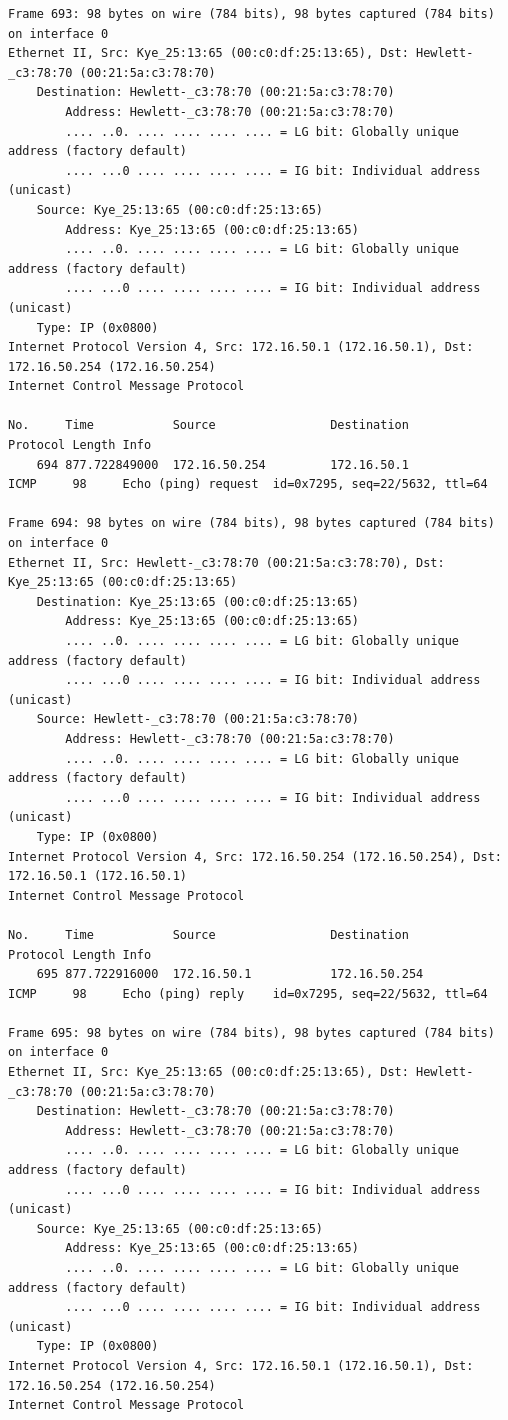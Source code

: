 \documentclass[a4paper,11pt]{article}
\begin{document}
\begin{lstlisting}
Frame 693: 98 bytes on wire (784 bits), 98 bytes captured (784 bits) on interface 0
Ethernet II, Src: Kye_25:13:65 (00:c0:df:25:13:65), Dst: Hewlett-_c3:78:70 (00:21:5a:c3:78:70)
    Destination: Hewlett-_c3:78:70 (00:21:5a:c3:78:70)
        Address: Hewlett-_c3:78:70 (00:21:5a:c3:78:70)
        .... ..0. .... .... .... .... = LG bit: Globally unique address (factory default)
        .... ...0 .... .... .... .... = IG bit: Individual address (unicast)
    Source: Kye_25:13:65 (00:c0:df:25:13:65)
        Address: Kye_25:13:65 (00:c0:df:25:13:65)
        .... ..0. .... .... .... .... = LG bit: Globally unique address (factory default)
        .... ...0 .... .... .... .... = IG bit: Individual address (unicast)
    Type: IP (0x0800)
Internet Protocol Version 4, Src: 172.16.50.1 (172.16.50.1), Dst: 172.16.50.254 (172.16.50.254)
Internet Control Message Protocol

No.     Time           Source                Destination           Protocol Length Info
    694 877.722849000  172.16.50.254         172.16.50.1           ICMP     98     Echo (ping) request  id=0x7295, seq=22/5632, ttl=64

Frame 694: 98 bytes on wire (784 bits), 98 bytes captured (784 bits) on interface 0
Ethernet II, Src: Hewlett-_c3:78:70 (00:21:5a:c3:78:70), Dst: Kye_25:13:65 (00:c0:df:25:13:65)
    Destination: Kye_25:13:65 (00:c0:df:25:13:65)
        Address: Kye_25:13:65 (00:c0:df:25:13:65)
        .... ..0. .... .... .... .... = LG bit: Globally unique address (factory default)
        .... ...0 .... .... .... .... = IG bit: Individual address (unicast)
    Source: Hewlett-_c3:78:70 (00:21:5a:c3:78:70)
        Address: Hewlett-_c3:78:70 (00:21:5a:c3:78:70)
        .... ..0. .... .... .... .... = LG bit: Globally unique address (factory default)
        .... ...0 .... .... .... .... = IG bit: Individual address (unicast)
    Type: IP (0x0800)
Internet Protocol Version 4, Src: 172.16.50.254 (172.16.50.254), Dst: 172.16.50.1 (172.16.50.1)
Internet Control Message Protocol

No.     Time           Source                Destination           Protocol Length Info
    695 877.722916000  172.16.50.1           172.16.50.254         ICMP     98     Echo (ping) reply    id=0x7295, seq=22/5632, ttl=64

Frame 695: 98 bytes on wire (784 bits), 98 bytes captured (784 bits) on interface 0
Ethernet II, Src: Kye_25:13:65 (00:c0:df:25:13:65), Dst: Hewlett-_c3:78:70 (00:21:5a:c3:78:70)
    Destination: Hewlett-_c3:78:70 (00:21:5a:c3:78:70)
        Address: Hewlett-_c3:78:70 (00:21:5a:c3:78:70)
        .... ..0. .... .... .... .... = LG bit: Globally unique address (factory default)
        .... ...0 .... .... .... .... = IG bit: Individual address (unicast)
    Source: Kye_25:13:65 (00:c0:df:25:13:65)
        Address: Kye_25:13:65 (00:c0:df:25:13:65)
        .... ..0. .... .... .... .... = LG bit: Globally unique address (factory default)
        .... ...0 .... .... .... .... = IG bit: Individual address (unicast)
    Type: IP (0x0800)
Internet Protocol Version 4, Src: 172.16.50.1 (172.16.50.1), Dst: 172.16.50.254 (172.16.50.254)
Internet Control Message Protocol


\end{lstlisting}
\end{document}
